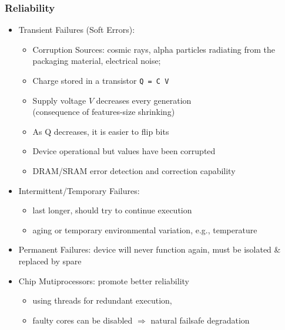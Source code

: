 \documentclass{beamer}
\renewcommand{\emph}[1]{\textcolor{structure}{#1}}
\newcommand{\emp}[1]{\textcolor{DikuRed}{ #1}}
\begin{document}
\begin{frame}[fragile,t]
\frametitle{Reliability}

\begin{itemize}
    \item \emp{Transient Failures (Soft Errors):}
        \begin{itemize}
            \item Corruption Sources: cosmic rays, alpha particles
                    radiating from the packaging material, electrical noise;
            \item Charge stored in a transistor \emp{\tt Q = C V}
            \item Supply voltage $V$ decreases every generation\\
                    (consequence of features-size shrinking)
            \item As Q decreases, it is easier to flip bits
            \item Device operational but values have been corrupted
            \item DRAM/SRAM error detection and correction capability
        \end  {itemize}\medskip

    \item \emp{Intermittent/Temporary Failures:}
            \begin{itemize}
                \item last longer, should try to continue execution
                \item aging or temporary environmental variation, e.g., temperature
            \end  {itemize}\medskip

    \item \emp{Permanent Failures:} device will never function again,
                must be isolated \& replaced by spare\medskip

    \item \emph{Chip Mutiprocessors: promote better reliability}
            \begin{itemize}
                \item using threads for redundant execution, 
                \item faulty cores can be disabled $\Rightarrow$ 
                        natural failsafe degradation
            \end  {itemize}
\end  {itemize}
\end{frame}
\end{document}
